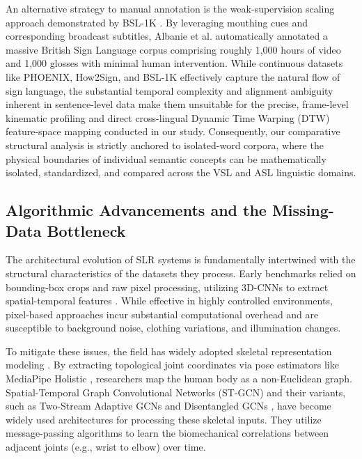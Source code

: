 \documentclass{ieeeaccess}
\begin{document}
An alternative strategy to manual annotation is the weak-supervision scaling approach demonstrated by BSL-1K \cite{albanie2020bsl1k}. By leveraging mouthing cues and corresponding broadcast subtitles, Albanie et al. automatically annotated a massive British Sign Language corpus comprising roughly 1,000 hours of video and 1,000 glosses with minimal human intervention. While continuous datasets like PHOENIX, How2Sign, and BSL-1K effectively capture the natural flow of sign language, the substantial temporal complexity and alignment ambiguity inherent in sentence-level data make them unsuitable for the precise, frame-level kinematic profiling and direct cross-lingual Dynamic Time Warping (DTW) feature-space mapping conducted in our study. Consequently, our comparative structural analysis is strictly anchored to isolated-word corpora, where the physical boundaries of individual semantic concepts can be mathematically isolated, standardized, and compared across the VSL and ASL linguistic domains.

\subsection{Algorithmic Advancements and the Missing-Data Bottleneck}
The architectural evolution of SLR systems is fundamentally intertwined with the structural characteristics of the datasets they process. Early benchmarks relied on bounding-box crops and raw pixel processing, utilizing 3D-CNNs to extract spatial-temporal features \cite{li2020wlasl}. While effective in highly controlled environments, pixel-based approaches incur substantial computational overhead and are susceptible to background noise, clothing variations, and illumination changes.

To mitigate these issues, the field has widely adopted skeletal representation modeling \cite{yin2020signbert}. By extracting topological joint coordinates via pose estimators like MediaPipe Holistic \cite{lugaresi2019mediapipe}, researchers map the human body as a non-Euclidean graph. Spatial-Temporal Graph Convolutional Networks (ST-GCN) \cite{stgcn2018} and their variants, such as Two-Stream Adaptive GCNs \cite{shi2019two} and Disentangled GCNs \cite{liu2020disentangling}, have become widely used architectures for processing these skeletal inputs. They utilize message-passing algorithms to learn the biomechanical correlations between adjacent joints (e.g., wrist to elbow) over time.
\end{document}
